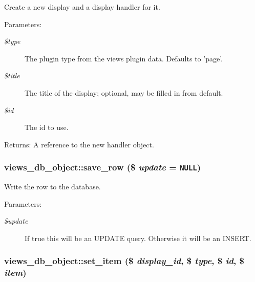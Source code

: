 Create a new display and a display handler for it. \begin{Desc}
\item[Parameters:]
\begin{description}
\item[{\em \$type}]The plugin type from the views plugin data. Defaults to 'page'. \item[{\em \$title}]The title of the display; optional, may be filled in from default. \item[{\em \$id}]The id to use. \end{description}
\end{Desc}
\begin{Desc}
\item[Returns:]A reference to the new handler object. \end{Desc}
\hypertarget{classviews__db__object_5e126880af73008d7ce245c24cfaebab}{
\subsubsection[{save\_\-row}]{\setlength{\rightskip}{0pt plus 5cm}views\_\-db\_\-object::save\_\-row (\$ {\em update} = {\tt NULL})}}
\label{classviews__db__object_5e126880af73008d7ce245c24cfaebab}


Write the row to the database.

\begin{Desc}
\item[Parameters:]
\begin{description}
\item[{\em \$update}]If true this will be an UPDATE query. Otherwise it will be an INSERT. \end{description}
\end{Desc}
\hypertarget{classviews__db__object_4ac5fda69733790427be9edd7c717568}{
\subsubsection[{set\_\-item}]{\setlength{\rightskip}{0pt plus 5cm}views\_\-db\_\-object::set\_\-item (\$ {\em display\_\-id}, \/  \$ {\em type}, \/  \$ {\em id}, \/  \$ {\em item})}}
\label{classviews__db__object_4ac5fda69733790427be9edd7c717568}


